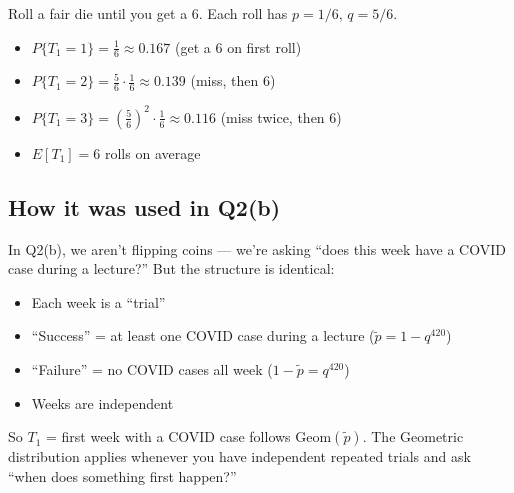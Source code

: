 \documentclass[12pt]{article}
\begin{document}
Roll a fair die until you get a 6. Each roll has $p = 1/6$, $q = 5/6$.
\begin{itemize}
    \item $P\{T_1 = 1\} = \frac{1}{6} \approx 0.167$ (get a 6 on first roll)
    \item $P\{T_1 = 2\} = \frac{5}{6} \cdot \frac{1}{6} \approx 0.139$ (miss, then 6)
    \item $P\{T_1 = 3\} = \left(\frac{5}{6}\right)^2 \cdot \frac{1}{6} \approx 0.116$ (miss twice, then 6)
    \item $E[T_1] = 6$ rolls on average
\end{itemize}

\subsection*{How it was used in Q2(b)}

In Q2(b), we aren't flipping coins --- we're asking ``does this week have a COVID case during a lecture?'' But the structure is identical:
\begin{itemize}
    \item Each week is a ``trial''
    \item ``Success'' = at least one COVID case during a lecture ($\tilde{p} = 1 - q^{420}$)
    \item ``Failure'' = no COVID cases all week ($1 - \tilde{p} = q^{420}$)
    \item Weeks are independent
\end{itemize}
So $T_1$ = first week with a COVID case follows $\text{Geom}(\tilde{p})$. The Geometric distribution applies whenever you have independent repeated trials and ask ``when does something first happen?''
\end{document}
